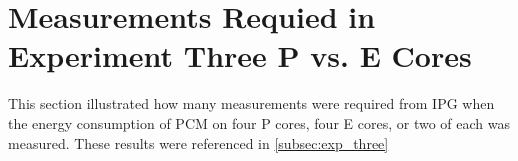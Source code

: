 \section*{Measurements Requied in Experiment Three P vs. E Cores}\label{app:p-vs-e}

This section illustrated how many measurements were required from IPG when the energy consumption of PCM on four P cores, four E cores, or two of each was measured. These results were referenced in \cref{subsec:exp_three}





% 
% 
% 
% 